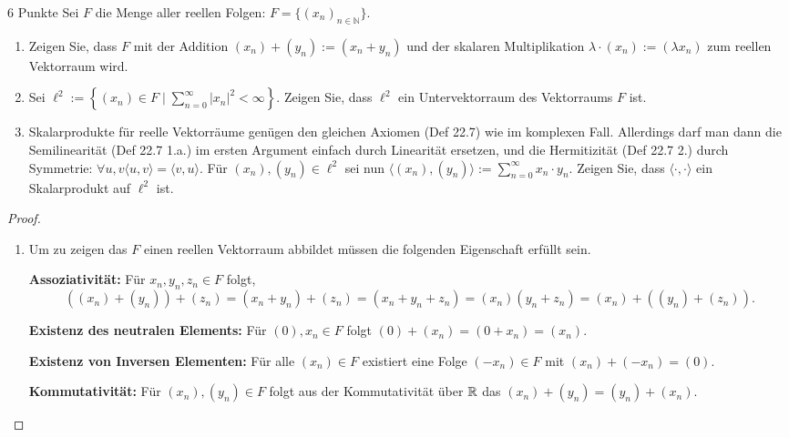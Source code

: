 \documentclass{problemset}
\begin{document}
\begin{problem}{6 Punkte}
Sei $F$ die Menge aller reellen Folgen: $F = \{(x_n)_{n\in\mathbb{N}}\}$.
\begin{enumerate}
    \item Zeigen Sie, dass $F$ mit der Addition $(x_n) + (y_n) := (x_n + y_n)$
          und der skalaren Multiplikation $\lambda \cdot (x_n) := (\lambda
              x_n)$ zum reellen Vektorraum wird.
    \item Sei $\ell^2 := \left\{(x_n) \in F \mid \sum_{n=0}^{\infty} |x_n|^2 <
              \infty\right\}$. Zeigen Sie, dass $\ell^2$ ein Untervektorraum des
          Vektorraums $F$ ist.
    \item Skalarprodukte für reelle Vektorräume genügen den gleichen Axiomen
          (Def 22.7) wie im komplexen Fall. Allerdings darf man dann die
          Semilinearität (Def 22.7 1.a.) im ersten Argument einfach durch
          Linearität ersetzen, und die Hermitizität (Def 22.7 2.) durch
          Symmetrie: $\forall u, v \langle u, v \rangle = \langle v, u
              \rangle$. Für $(x_n), (y_n) \in \ell^2$ sei nun $\langle (x_n), (y_n)
              \rangle := \sum_{n=0}^{\infty} x_n \cdot y_n$. Zeigen Sie, dass
          $\langle \cdot, \cdot \rangle$ ein Skalarprodukt auf $\ell^2$ ist.
\end{enumerate}

\begin{proof}
    \leavevmode
    \begin{enumerate}
        \item Um zu zeigen das \(F\) einen reellen Vektorraum abbildet müssen
              die folgenden Eigenschaft erfüllt sein.

              \textbf{Assoziativität:} Für \(x_n,y_n,z_n
              \in F\) folgt, \[
                  ((x_n) + (y_n)) + (z_n) = (x_n + y_n) + (z_n) = (x_n + y_n + z_n) = (x_n) (y_n + z_n) = (x_n) + ((y_n) + (z_n)).
              \]

              \textbf{Existenz des neutralen Elements:} Für \((0), x_n \in F\) folgt \((0) + (x_n) = (0 + x_n) = (x_n)\).

              \textbf{Existenz von Inversen Elementen:} Für alle \((x_n) \in F\) existiert eine Folge \((-x_n) \in F\) mit \((x_n) + (-x_n) = (0)\).

              \textbf{Kommutativität:} Für \((x_n), (y_n) \in F\) folgt aus der Kommutativität über \(\mathbb{R}\) das \((x_n) + (y_n) = (y_n) + (x_n)\).


\end{enumerate}
\end{proof}
\end{problem}
\end{document}
